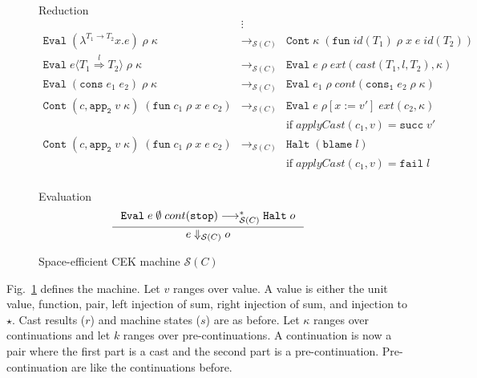 \documentclass[acmsmall,review,anonymous]{acmart}\settopmatter{printfolios=true,printccs=false,printacmref=false}
\newcommand{\figref}[1]{Fig.~\ref{#1}}
\newcommand{\sOOinspect}[3]{\mathtt{Eval} \; #1 \; #2 \; #3}
\newcommand{\sOOreturn}[2]{\mathtt{Cont} \; #2 \; #1}
\newcommand{\sOOhalt}[1]{\mathtt{Halt} \; #1}
\newcommand{\TOOdyn}[0]{\star}
\newcommand{\eOOlam}[4]{\lambda^{#1\rightarrow{}#2}#3.#4}
\newcommand{\eOOcons}[2]{\mathtt{cons} \; #1 \; #2}
\newcommand{\eOOcast}[4]{#1 \langle \cOOcast{#2}{#3}{#4} \rangle}
\newcommand{\oOOblame}[1]{\mathtt{blame} \; #1}
\newcommand{\cOOcast}[3]{#1 \overset{#2}{\Rightarrow} #3}
\newcommand{\rOOsucc}[1]{\mathtt{succ}\;#1}
\newcommand{\rOOfail}[1]{\mathtt{fail}\;#1}
\newcommand{\hcvOOfun}[5]{\mathtt{fun} \; #1 \; #2 \; #3 \; #4 \; #5}
\newcommand{\hckOOmt}[0]{\mathtt{stop}}
\newcommand{\hckOOconsI}[3]{\mathtt{cons_1}\;#1\;#2\;#3}
\newcommand{\hckOOappII}[2]{\mathtt{app_2}\;#1\;#2}
\newcommand{\sidecond}[1]{\text{if}\;#1}
\newcommand{\judgeSreduce}[3]{#2 \longrightarrow_{\mathcal{S}(#1)} #3}
\newcommand{\judgeSreduceTrans}[3]{#2 \longrightarrow_{\mathcal{S}(#1)}^{*} #3}
\newcommand{\judgeSeval}[3]{#2 \Downarrow_{\mathcal{S}(#1)} #3}
\newcommand{\redruleS}[3]{#1 & \longrightarrow_{\mathcal{S}(C)} & #2 & #3\\}
\begin{document}
\begin{figure}
	Reduction \fbox{$ \judgeSreduce{C}{s}{s} $}
	\[
	\begin{array}{rclr}
	& \vdots \\
	\redruleS{
		\sOOinspect{(\eOOlam{T_1}{T_2}{x}{e})}{\rho}{\kappa}
	}{
		\sOOreturn{(\hcvOOfun{id(T_1)}{\rho}{x}{e}{id(T_2)})}{\kappa}
	}{}
	\redruleS{
		\sOOinspect{\eOOcast{e}{T_1}{l}{T_2}}{\rho}{\kappa}
	}{
		\sOOinspect{e}{\rho}{ext(cast(T_1,l,T_2),\kappa)}
	}{}
	\redruleS{
		\sOOinspect{(\eOOcons{e_1}{e_2})}{\rho}{\kappa}
	}{
		\sOOinspect{e_1}{\rho}{cont(\hckOOconsI{e_2}{\rho}{\kappa})}
	}{}
	\redruleS{
		\sOOreturn{(\hcvOOfun{c_1}{\rho}{x}{e}{c_2})}{(c,\hckOOappII{v}{\kappa})}
	}{
		\sOOinspect{e}{\rho[x:=v']}{ext(c_2,\kappa)}
	}{
		\\ & &
		\sidecond{applyCast(c_1,v) = \rOOsucc{v'}}
	}
	\redruleS{
		\sOOreturn{(\hcvOOfun{c_1}{\rho}{x}{e}{c_2})}{(c,\hckOOappII{v}{\kappa})}
	}{
		\sOOhalt{(\oOOblame{l})}
	}{
		\\ & &
		\sidecond{applyCast(c_1,v) = \rOOfail{l}}
	}
	\end{array}
	\]
	
	
	Evaluation \fbox{$ \judgeSeval{C}{e}{o} $}
	\[
	\inference{
		\judgeSreduceTrans{C}{
			\sOOinspect{e}{\emptyset}{cont(\hckOOmt)}
		}{
			\sOOhalt{o}
		}		
	}{
		\judgeSeval{C}{e}{o}
	}
	\]
	
	\caption{Space-efficient CEK machine $ \mathcal{S}(C) $}
	\label{machine-cekcc}
\end{figure}

\figref{machine-cekcc} defines the machine. 
Let $ v $ ranges over value. A value is either the unit value, function, pair, 
left injection of sum, right injection of sum, and injection to $ \TOOdyn $.
Cast results ($ r $) and machine states ($ s $) are as before. 
Let $ \kappa $ ranges over continuations and let $ k $ ranges over 
pre-continuations. 
A continuation is now a pair where the first part is a cast and the second 
part is a pre-continuation. 
Pre-continuation are like the continuations before.
\end{document}
